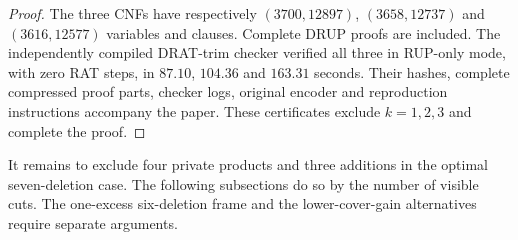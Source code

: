 \begin{proof}
The three CNFs have respectively $(3700,12897)$, $(3658,12737)$ and $(3616,12577)$ variables and clauses. Complete DRUP proofs are included. The independently compiled DRAT-trim checker verified all three in RUP-only mode, with zero RAT steps, in $87.10$, $104.36$ and $163.31$ seconds. Their hashes, complete compressed proof parts, checker logs, original encoder and reproduction instructions accompany the paper. These certificates exclude $k=1,2,3$ and complete the proof.
\end{proof}

It remains to exclude four private products and three additions in the optimal seven-deletion case. The following subsections do so by the number of visible cuts. The one-excess six-deletion frame and the lower-cover-gain alternatives require separate arguments.
